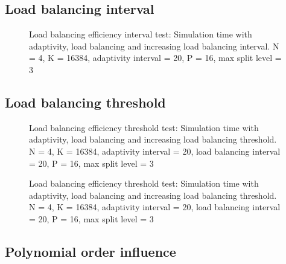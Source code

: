 
\subsection{Load balancing interval} \label{section:results:load_balancing_performance:interval}

\begin{figure}[H]
	\centering
	
	\caption{Load balancing efficiency interval test: Simulation time with adaptivity, load balancing and increasing load balancing interval. N = 4, K = 16384, adaptivity interval = 20, P = 16, max split level = 3}
	\label{fig:load_balancing_efficiency_interval}
\end{figure}

\subsection{Load balancing threshold} \label{section:results:load_balancing_performance:threshold}

\begin{figure}[H]
	\centering
	
	\caption{Load balancing efficiency threshold test: Simulation time with adaptivity, load balancing and increasing load balancing threshold. N = 4, K = 16384, adaptivity interval = 20, load balancing interval = 20, P = 16, max split level = 3}
	\label{fig:load_balancing_efficiency_threshold_s3}
\end{figure}

\begin{figure}[H]
	\centering
	
	\caption{Load balancing efficiency threshold test: Simulation time with adaptivity, load balancing and increasing load balancing threshold. N = 4, K = 16384, adaptivity interval = 20, load balancing interval = 20, P = 16, max split level = 3}
	\label{fig:load_balancing_efficiency_threshold_s5}
\end{figure}

\subsection{Polynomial order influence}
\label{section:results:load_balancing_performance:polynomial_order}

